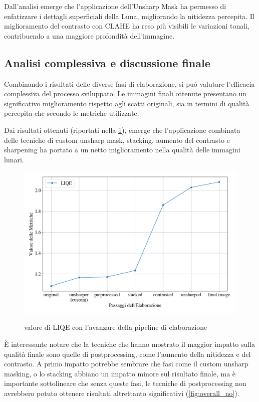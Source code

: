 Dall'analisi emerge che l'applicazione dell'Unsharp Mask ha permesso di enfatizzare i dettagli superficiali della Luna, migliorando la nitidezza percepita. Il miglioramento del contrasto con CLAHE ha reso più visibili le variazioni tonali, contribuendo a una maggiore profondità dell'immagine.

\subsection{Analisi complessiva e discussione finale}

Combinando i risultati delle diverse fasi di elaborazione, si può valutare l'efficacia complessiva del processo sviluppato. Le immagini finali ottenute presentano un significativo miglioramento rispetto agli scatti originali, sia in termini di qualità percepita che secondo le metriche utilizzate.

Dai risultati ottenuti (riportati nella \cref{fig:overall}), emerge che l'applicazione combinata delle tecniche di custom unsharp mask, stacking, aumento del contrasto e sharpening ha portato a un netto miglioramento nella qualità delle immagini lunari. 

\begin{figure}[H]
    \centering
    \caption{valore di LIQE con l'avanzare della pipeline di elaborazione}
    \includegraphics[width=\linewidth]{../assets/overall.png}
    \label{fig:overall}
\end{figure}

È interessante notare che la tecniche che hanno mostrato il maggior impatto sulla qualità finale sono quelle di postprocessing, come l'aumento della nitidezza e del contrasto. A primo impatto potrebbe sembrare che fasi come il custom unsharp masking, o lo stacking abbiano un impatto minore sul risultato finale, ma è importante sottolineare che senza queste fasi, le tecniche di postprocessing non avrebbero potuto ottenere risultati altrettanto significativi (\cref{fig:overall_no}).

